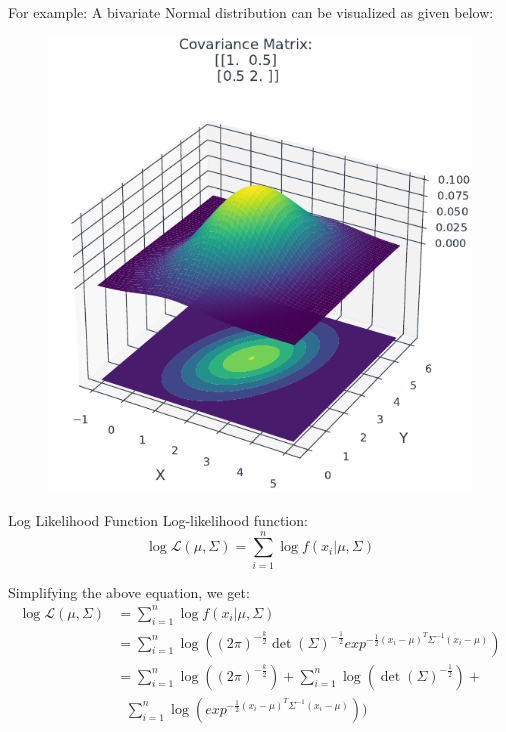 \documentclass{beamer}
\begin{document}
\begin{frame}
    For example: A bivariate Normal distribution can be visualized as given below:
    \begin{figure}
                \centerline{\includegraphics[scale = 0.75]{../figures/mle/bivariate_normal.pdf}}
\end{figure}
    
\end{frame}

\begin{frame}{Log Likelihood Function}
    Log-likelihood function:
    \begin{equation}
        \log \mathcal{L}(\mu, \Sigma) = \sum_{i=1}^n \log f(x_i|\mu, \Sigma)
    \end{equation}

    Simplifying the above equation, we get:
    \begin{align*}
        \log \mathcal{L}(\mu, \Sigma) &= \sum_{i=1}^n \log f(x_i|\mu, \Sigma) \\
        &= \sum_{i=1}^n \log \left((2\pi)^{-\frac{k}{2}}\det(\Sigma)^{-\frac{1}{2}}exp^{-\frac{1}{2}(x_i-\mu)^{T}\Sigma^{-1}(x_i-\mu)} \right) \\
        &= \sum_{i=1}^n \log ((2\pi)^{-\frac{k}{2}}) + \sum_{i=1}^n \log (\det(\Sigma)^{-\frac{1}{2}}) + \\ & \ \ \ \sum_{i=1}^n \log(exp^{-\frac{1}{2}(x_i-\mu)^{T}\Sigma^{-1}(x_i-\mu)} )) 
        \end{align*}
\end{frame}
\end{document}
